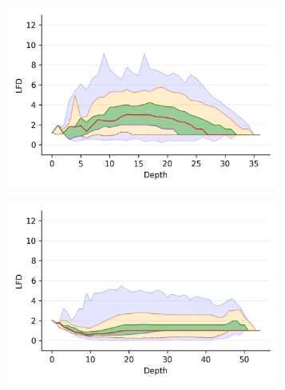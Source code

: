 \begin{figure}
    \captionsetup[subfigure]{aboveskip=-15pt,belowskip=-3pt}
    \begin{subfigure}[b]{0.5\textwidth}
        \includegraphics[width=0.99\textwidth]{images/lfd/fashion-mnist.png}\\
        \label{fig:results:fashion-mnist-lfd}
    \end{subfigure}%
    \begin{subfigure}[b]{0.5\textwidth}
        \includegraphics[width=0.99\textwidth]{images/lfd/glove-25.png}\\
        \label{fig:results:glove-25-lfd}
    \end{subfigure}
    \\
    \begin{subfigure}[b]{0.5\textwidth}

\end{subfigure}
\end{figure}
